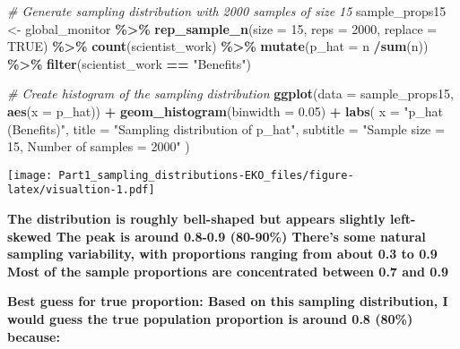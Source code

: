\documentclass[
]{article}
\newenvironment{Shaded}{\begin{snugshade}}{\end{snugshade}}
\newcommand{\AttributeTok}[1]{\textcolor[rgb]{0.13,0.29,0.53}{#1}}
\newcommand{\CommentTok}[1]{\textcolor[rgb]{0.56,0.35,0.01}{\textit{#1}}}
\newcommand{\ConstantTok}[1]{\textcolor[rgb]{0.56,0.35,0.01}{#1}}
\newcommand{\DecValTok}[1]{\textcolor[rgb]{0.00,0.00,0.81}{#1}}
\newcommand{\FloatTok}[1]{\textcolor[rgb]{0.00,0.00,0.81}{#1}}
\newcommand{\FunctionTok}[1]{\textcolor[rgb]{0.13,0.29,0.53}{\textbf{#1}}}
\newcommand{\NormalTok}[1]{#1}
\newcommand{\OtherTok}[1]{\textcolor[rgb]{0.56,0.35,0.01}{#1}}
\newcommand{\SpecialCharTok}[1]{\textcolor[rgb]{0.81,0.36,0.00}{\textbf{#1}}}
\newcommand{\StringTok}[1]{\textcolor[rgb]{0.31,0.60,0.02}{#1}}
\begin{document}
\begin{Shaded}
\begin{Highlighting}[]
\CommentTok{\# Generate sampling distribution with 2000 samples of size 15}
\NormalTok{sample\_props15 }\OtherTok{\textless{}{-}}\NormalTok{ global\_monitor }\SpecialCharTok{\%\textgreater{}\%}
                    \FunctionTok{rep\_sample\_n}\NormalTok{(}\AttributeTok{size =} \DecValTok{15}\NormalTok{, }\AttributeTok{reps =} \DecValTok{2000}\NormalTok{, }\AttributeTok{replace =} \ConstantTok{TRUE}\NormalTok{) }\SpecialCharTok{\%\textgreater{}\%}
                    \FunctionTok{count}\NormalTok{(scientist\_work) }\SpecialCharTok{\%\textgreater{}\%}
                    \FunctionTok{mutate}\NormalTok{(}\AttributeTok{p\_hat =}\NormalTok{ n }\SpecialCharTok{/}\FunctionTok{sum}\NormalTok{(n)) }\SpecialCharTok{\%\textgreater{}\%}
                    \FunctionTok{filter}\NormalTok{(scientist\_work }\SpecialCharTok{==} \StringTok{"Benefits"}\NormalTok{)}
\end{Highlighting}
\end{Shaded}

\begin{Shaded}
\begin{Highlighting}[]
\CommentTok{\# Create histogram of the sampling distribution}
\FunctionTok{ggplot}\NormalTok{(}\AttributeTok{data =}\NormalTok{ sample\_props15, }\FunctionTok{aes}\NormalTok{(}\AttributeTok{x =}\NormalTok{ p\_hat)) }\SpecialCharTok{+}
  \FunctionTok{geom\_histogram}\NormalTok{(}\AttributeTok{binwidth =} \FloatTok{0.05}\NormalTok{) }\SpecialCharTok{+}
  \FunctionTok{labs}\NormalTok{(}
    \AttributeTok{x =} \StringTok{"p\_hat (Benefits)"}\NormalTok{,}
    \AttributeTok{title =} \StringTok{"Sampling distribution of p\_hat"}\NormalTok{,}
    \AttributeTok{subtitle =} \StringTok{"Sample size = 15, Number of samples = 2000"}
\NormalTok{  )}
\end{Highlighting}
\end{Shaded}

\texttt{[image: Part1\_sampling\_distributions-EKO\_files/figure-latex/visualtion-1.pdf]}

\textbf{The distribution is roughly bell-shaped but appears slightly
left-skewed The peak is around 0.8-0.9 (80-90\%) There's some natural
sampling variability, with proportions ranging from about 0.3 to 0.9
Most of the sample proportions are concentrated between 0.7 and 0.9}

\textbf{Best guess for true proportion: Based on this sampling
distribution, I would guess the true population proportion is around 0.8
(80\%) because:}
\end{document}
